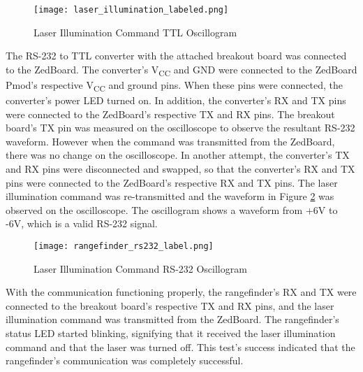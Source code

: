 \begin{figure}[H]
	\centerline{\texttt{[image: laser\_illumination\_labeled.png]}}
	\caption{Laser Illumination Command TTL Oscillogram}
	\label{laser_illumination}
\end{figure}

The RS-232 to TTL converter with the attached breakout board was connected to the ZedBoard. The converter's V\textsubscript{CC} and GND were connected to the ZedBoard Pmod's respective V\textsubscript{CC} and ground pins. When these pins were connected, the converter's power LED turned on. In addition, the converter's RX and TX pins were connected to the ZedBoard's respective TX and RX pins. The breakout board's TX pin was measured on the oscilloscope to observe the resultant RS-232 waveform. However when the command was transmitted from the ZedBoard, there was no change on the oscilloscope. In another attempt, the converter's TX and RX pins were disconnected and swapped, so that the converter's RX and TX pins were connected to the ZedBoard's respective RX and TX pins. The laser illumination command was re-transmitted and the waveform in Figure \ref{rangefinder_rs232} was observed on the oscilloscope. The oscillogram shows a waveform from +6V to -6V, which is a valid RS-232 signal.

\begin{figure}[H]
	\centerline{\texttt{[image: rangefinder\_rs232\_label.png]}}
	\caption{Laser Illumination Command RS-232 Oscillogram}
	\label{rangefinder_rs232}
\end{figure}

With the communication functioning properly, the rangefinder's RX and TX were connected to the breakout board's respective TX and RX pins, and the laser illumination command was transmitted from the ZedBoard. The rangefinder's status LED started blinking, signifying that it received the laser illumination command and that the laser was turned off. This test's success indicated that the rangefinder's communication was completely successful.

